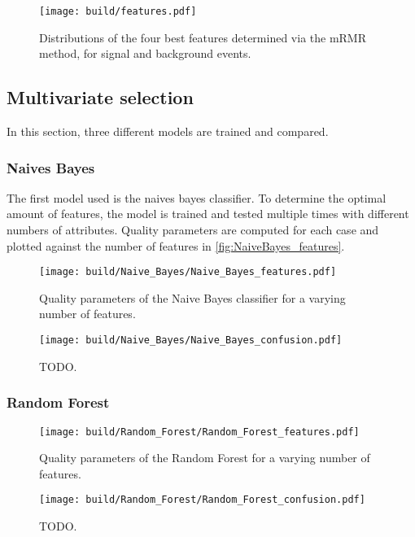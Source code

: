 \begin{figure}[H]
  \centering
  \texttt{[image: build/features.pdf]}
  \caption{Distributions of the four best features determined via the mRMR method, for signal and background events.}
  \label{fig:features}
\end{figure}

\subsection{Multivariate selection}

In this section, three different models are trained and compared. 

\subsubsection{Naives Bayes}

The first model used is the naives bayes classifier. To determine the optimal amount of
features, the model is trained and tested multiple times with different numbers of attributes.
Quality parameters  are computed for each case and plotted against the number of features in \autoref{fig:NaiveBayes_features}.

\begin{figure}[H]
  \centering
  \texttt{[image: build/Naive\_Bayes/Naive\_Bayes\_features.pdf]}
  \caption{Quality parameters of the Naive Bayes classifier for a varying number of features.}
  \label{fig:NaiveBayes_features}
\end{figure}

\begin{figure}[H]
  \centering
  \texttt{[image: build/Naive\_Bayes/Naive\_Bayes\_confusion.pdf]}
  \caption{TODO.}
  \label{fig:NaiveBayes_confusion}
\end{figure}

\subsubsection{Random Forest}

\begin{figure}[H]
  \centering
  \texttt{[image: build/Random\_Forest/Random\_Forest\_features.pdf]}
  \caption{Quality parameters of the Random Forest for a varying number of features.}
  \label{fig:RandomForest_features}
\end{figure}

\begin{figure}[H]
  \centering
  \texttt{[image: build/Random\_Forest/Random\_Forest\_confusion.pdf]}
  \caption{TODO.}
  \label{fig:RandomForest_confusion}
\end{figure}

